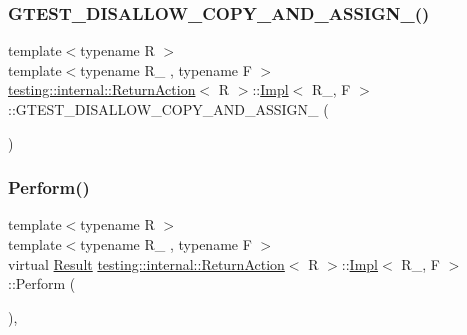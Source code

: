 \subsubsection{\texorpdfstring{G\+T\+E\+S\+T\+\_\+\+D\+I\+S\+A\+L\+L\+O\+W\+\_\+\+C\+O\+P\+Y\+\_\+\+A\+N\+D\+\_\+\+A\+S\+S\+I\+G\+N\+\_\+()}{GTEST\_DISALLOW\_COPY\_AND\_ASSIGN\_()}}
{\footnotesize\ttfamily template$<$typename R $>$ \\
template$<$typename R\+\_\+ , typename F $>$ \\
\hyperlink{classtesting_1_1internal_1_1ReturnAction}{testing\+::internal\+::\+Return\+Action}$<$ R $>$\+::\hyperlink{classtesting_1_1internal_1_1ReturnAction_1_1Impl}{Impl}$<$ R\+\_\+, F $>$\+::G\+T\+E\+S\+T\+\_\+\+D\+I\+S\+A\+L\+L\+O\+W\+\_\+\+C\+O\+P\+Y\+\_\+\+A\+N\+D\+\_\+\+A\+S\+S\+I\+G\+N\+\_\+ (\begin{DoxyParamCaption}\item[{\hyperlink{classtesting_1_1internal_1_1ReturnAction_1_1Impl}{Impl}$<$ R\+\_\+, F $>$}]{ }\end{DoxyParamCaption})\hspace{0.3cm}{\ttfamily [private]}}

\mbox{\label{classtesting_1_1internal_1_1ReturnAction_1_1Impl_ad643ea98eada205da6c4bcfb6c66cd2c}} 
\subsubsection{\texorpdfstring{Perform()}{Perform()}}
{\footnotesize\ttfamily template$<$typename R $>$ \\
template$<$typename R\+\_\+ , typename F $>$ \\
virtual \hyperlink{classtesting_1_1internal_1_1ReturnAction_1_1Impl_a681fdf18258f86ea31efe0c55217e571}{Result} \hyperlink{classtesting_1_1internal_1_1ReturnAction}{testing\+::internal\+::\+Return\+Action}$<$ R $>$\+::\hyperlink{classtesting_1_1internal_1_1ReturnAction_1_1Impl}{Impl}$<$ R\+\_\+, F $>$\+::Perform (\begin{DoxyParamCaption}\item[{const \hyperlink{classtesting_1_1ActionInterface_af72720d864da4d606629e83edc003511}{Argument\+Tuple} \&}]{ }\end{DoxyParamCaption})\hspace{0.3cm}{\ttfamily [inline]}, {\ttfamily [virtual]}}



